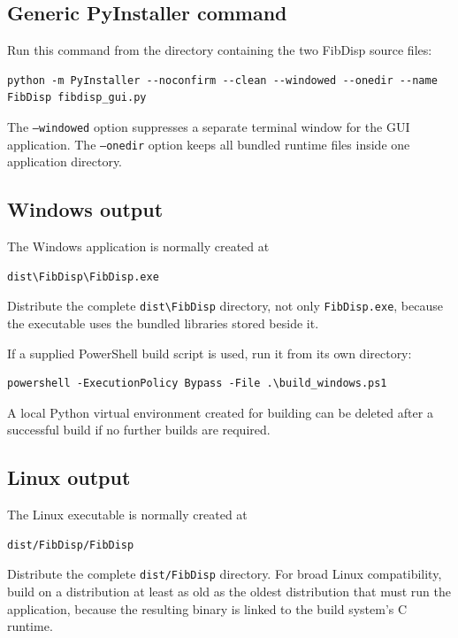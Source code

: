 \documentclass[11pt,a4paper]{article}
\begin{document}
\subsection{Generic PyInstaller command}

Run this command from the directory containing the two FibDisp source files:

\begin{lstlisting}
python -m PyInstaller --noconfirm --clean --windowed --onedir --name FibDisp fibdisp_gui.py
\end{lstlisting}

The \texttt{--windowed} option suppresses a separate terminal window for the
GUI application. The \texttt{--onedir} option keeps all bundled runtime files
inside one application directory.

\subsection{Windows output}

The Windows application is normally created at

\begin{lstlisting}
dist\FibDisp\FibDisp.exe
\end{lstlisting}

Distribute the complete \texttt{dist\textbackslash FibDisp} directory, not only
\texttt{FibDisp.exe}, because the executable uses the bundled libraries stored
beside it.

If a supplied PowerShell build script is used, run it from its own directory:

\begin{lstlisting}
powershell -ExecutionPolicy Bypass -File .\build_windows.ps1
\end{lstlisting}

A local Python virtual environment created for building can be deleted after a
successful build if no further builds are required.

\subsection{Linux output}

The Linux executable is normally created at

\begin{lstlisting}
dist/FibDisp/FibDisp
\end{lstlisting}

Distribute the complete \texttt{dist/FibDisp} directory. For broad Linux
compatibility, build on a distribution at least as old as the oldest
distribution that must run the application, because the resulting binary is
linked to the build system's C runtime.
\end{document}
